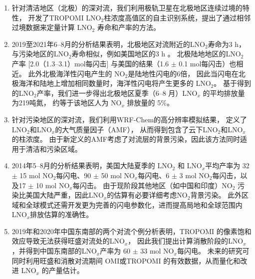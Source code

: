 \begin{enumerate}[label=（\arabic*）, labelindent=\parindent, leftmargin=0pt, widest=0, itemindent=*, topsep=0pt, partopsep=0pt, parsep=0pt]

\item 针对清洁地区（北极）的深对流，我们利用极轨卫星在北极地区连续过境的特性，
开发了TROPOMI LNO$_2$柱浓度高值区的自主识别系统，提出了通过相邻过境数据来定量计算 LNO$_2$ 寿命和产率的方法。

\item 2019至2021年6--8月的分析结果表明，北极地区对流附近的LNO$_2$寿命为3 h，
与污染地区的LNO$_2$寿命相似，例如美国地区的3 h \citep{Nault.2017}。
北极陆地地区的LNO$_2$ 产率 [2.0（1.3--3.1）mol每闪击] 与美国的结果（1.6 $\pm$ 0.1 mol每闪击）也相近\citep{Lapierre.2020}。
此外北极海洋性闪电产生的 NO$_2$是陆地性闪电的6倍，
因此当闪电在北极海洋和陆地上增加相同数量时，海洋性闪电将产生更多的 LNO$_2$。
基于得到的LNO$_2$产率，我们进一步得出北极地区夏季（6--8 月）LNO$_x$ 的平均排放量为219吨氮，
约等于该地区人为 NO$_x$ 排放量的 5\%。

\item 针对污染地区的深对流，我们利用WRF-Chem的高分辨率模拟结果，
定义了LNO$_2$和LNO$_x$的大气质量因子（AMF），
从而得到包含了云下LNO$_2$和LNO$_x$的柱浓度。
由于新定义的AMF考虑了对流层的背景污染，因此该方法同时适用于清洁和污染区域。

\item 2014年5--8月的分析结果表明，美国大陆夏季的 LNO$_2$ 和 LNO$_x$平均产率为
32 $\pm$ 15 mol NO$_2$每闪电、90 $\pm$ 50 mol NO$_x$每闪电、6 $\pm$ 3 mol NO$_2$每闪击，以及17 $\pm$ 10 mol NO$_x$每闪击。
由于现阶段其他地区（如中国和印度）NO$_2$ 污染比美国大陆严重，因此LNO$_x$的估算有必要详细考虑NO$_2$背景污染。
此外区域和全球模式还需开发更为完善的闪电参数化，进而提高局地和全球范围内LNO$_x$排放估算的准确性。

\item 2019年和2020年中国东南部的两个对流个例分析表明，TROPOMI 的像素饱和效应导致无法获得旺盛对流处的LNO$_x$，
因此我们提出计算消散阶段的LNO$_x$，并得到中国东南部的LNO$_x$产率为 60 $\pm$ 33 mol NO$_x$每闪电。
未来的研究可同时利用旺盛和消散对流期间 OMI或TROPOMI 的有效数据，从而量化和改进 LNO$_x$ 的产量估计。

\end{enumerate}

